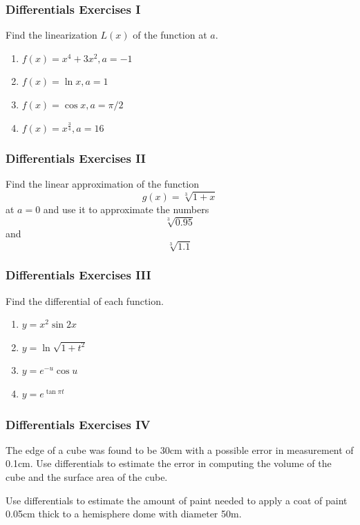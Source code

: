 \documentclass[xcolor=dvipsnames]{beamer}
\begin{document}
\begin{frame}
  \frametitle{Differentials Exercises I}
{\ubung} Find the linearization $L(x)$ of the function at $a$.
\begin{enumerate}
\item $\displaystyle f(x)=x^{4}+3x^{2},a=-1$
\item $\displaystyle f(x)=\ln{}x,a=1$
\item $\displaystyle f(x)=\cos{}x,a=\pi/2$
\item $\displaystyle f(x)=x^{\frac{3}{4}},a=16$
\end{enumerate}
\end{frame}

\begin{frame}
  \frametitle{Differentials Exercises II}
{\ubung} Find the linear approximation of the function 
\begin{equation}
  \label{eq:ceengaet}
g(x)=\sqrt[3]{1+x}
\end{equation}
at $a=0$ and use it to approximate the numbers 
\begin{equation}
  \label{eq:ciaghier}
\sqrt[3]{0.95}
\end{equation}
and
\begin{equation}
  \label{eq:woozahme}
\sqrt[3]{1.1}
\end{equation}
\end{frame}

\begin{frame}
  \frametitle{Differentials Exercises III}
{\ubung} Find the differential of each function.
\begin{enumerate}
\item $\displaystyle y=x^{2}\sin{}2x$ 
\item $\displaystyle y=\ln\sqrt{1+t^{2}}$
\item $\displaystyle y=e^{-u}\cos{}u$
\item $\displaystyle y=e^{\tan\pi{}t}$
\end{enumerate}
\end{frame}

\begin{frame}
  \frametitle{Differentials Exercises IV}
{\ubung} The edge of a cube was found to be 30cm with a possible error
in measurement of 0.1cm. Use differentials to estimate the error in
computing the volume of the cube and the surface area of the cube.

\bigskip

{\ubung} Use differentials to estimate the amount of paint needed to
apply a coat of paint 0.05cm thick to a hemisphere dome with diameter
50m.
\end{frame}
\end{document}
